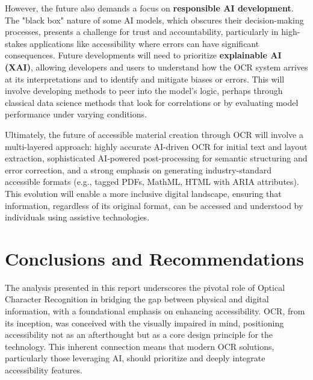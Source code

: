 However, the future also demands a focus on \textbf{responsible AI development}. The "black box" nature of some AI models, which obscures their decision-making processes, presents a challenge for trust and accountability, particularly in high-stakes applications like accessibility where errors can have significant consequences. Future developments will need to prioritize \textbf{explainable AI (XAI)}, allowing developers and users to understand how the OCR system arrives at its interpretations and to identify and mitigate biases or errors. This will involve developing methods to peer into the model's logic, perhaps through classical data science methods that look for correlations or by evaluating model performance under varying conditions.

Ultimately, the future of accessible material creation through OCR will involve a multi-layered approach: highly accurate AI-driven OCR for initial text and layout extraction, sophisticated AI-powered post-processing for semantic structuring and error correction, and a strong emphasis on generating industry-standard accessible formats (e.g., tagged PDFs, MathML, HTML with ARIA attributes). This evolution will enable a more inclusive digital landscape, ensuring that information, regardless of its original format, can be accessed and understood by individuals using assistive technologies.

\section{Conclusions and Recommendations}

The analysis presented in this report underscores the pivotal role of Optical Character Recognition in bridging the gap between physical and digital information, with a foundational emphasis on enhancing accessibility. OCR, from its inception, was conceived with the visually impaired in mind, positioning accessibility not as an afterthought but as a core design principle for the technology. This inherent connection means that modern OCR solutions, particularly those leveraging AI, should prioritize and deeply integrate accessibility features.

